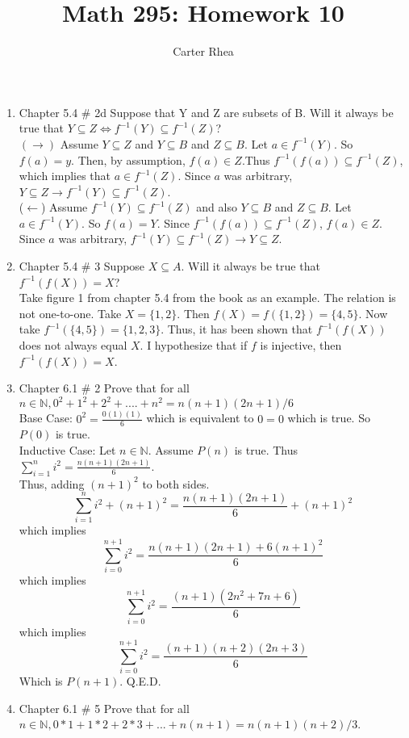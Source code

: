 \documentclass[10pt,a4paper]{article}
\author{Carter Rhea}
\title{Math 295: Homework 10}
\begin{document}
\maketitle
\begin{enumerate}
\item Chapter 5.4 \# 2d Suppose that Y and Z are subsets of B. Will it always be true that $Y \subseteq Z \iff f^{-1}(Y)\subseteq f^{-1}(Z)$?\\
$(\rightarrow)$ Assume $Y \subseteq Z$ and $Y \subseteq B$ and $Z \subseteq B$. Let $a \in f^{-1}(Y)$. So $f(a)=y$. Then, by assumption, $f(a) \in Z$.Thus $f^{-1}(f(a)) \subseteq f^{-1}(Z)$, which implies that $a \in f^{-1}(Z)$. Since $a$ was  arbitrary, $Y \subseteq Z \to f^{-1}(Y) \subseteq f^{-1}(Z)$.\\
($\leftarrow$) Assume $f^{-1}(Y) \subseteq f^{-1}(Z)$ and also $Y \subseteq B$ and $Z \subseteq B$. Let $a \in f^{-1}(Y)$. So $f(a)=Y$. Since $f^{-1}(f(a)) \subseteq f^{-1}(Z)$, $f(a) \in Z$. Since $a$ was arbitrary, $f^{-1}(Y) \subseteq f^{-1}(Z) \to Y \subseteq Z$. 
\item Chapter 5.4 \# 3 Suppose $X \subseteq A$. Will it always be true that $f^{-1}(f(X))=X$? \\
Take figure 1 from chapter 5.4 from the book as an example. The relation is not one-to-one. Take $X=\{1,2\}$. Then $f(X)=f(\{1,2\})=\{4,5\}.$ Now take $f^{-1}(\{4,5\})= \{1,2,3\}$. Thus, it has been shown that $f^{-1}(f(X))$ does not always equal $X$. I hypothesize that if $f$ is injective, then $f^{-1}(f(X))=X$. 
\item  Chapter 6.1 \# 2 Prove that for all $n \in \mathbb{N}, 0^2 + 1^2 + 2^2 + .... + n^2= n(n+1)(2n+1)/6$\\
Base Case: $0^2 = \frac{0(1)(1)}{6}$ which is equivalent to $0=0$ which is true. So $P(0)$ is true.\\
Inductive Case: Let $n \in \mathbb{N}$. Assume $P(n)$ is true. Thus $\sum\limits_{i=1}^n i^2 = \frac{n(n+1)(2n+1)}{6}$.\\ Thus, adding $(n+1)^2$ to both sides. 
$$\sum\limits_{i=1}^n i^2 + (n+1)^2= \frac{n(n+1)(2n+1)}{6} + (n+1)^2  $$ which implies
$$\sum\limits_{i=0}^{n+1} i^2 = \frac{n(n+1)(2n+1) +6(n+1)^2}{6} $$ which implies
$$\sum\limits_{i=0}^{n+1} i^2 = \frac{(n+1)(2n^2+7n+6)}{6} $$ which implies
$$\sum\limits_{i=0}^{n+1} i^2 = \frac{(n+1)(n+2)(2n+3)}{6} $$
Which is $P(n+1)$. Q.E.D.
\item Chapter 6.1 \# 5 Prove that for all $n \in \mathbb{N}, 0*1 +1*2 +2*3 +... + n(n+1)= n(n+1)(n+2)/3$.\\

\end{enumerate}
\end{document}
